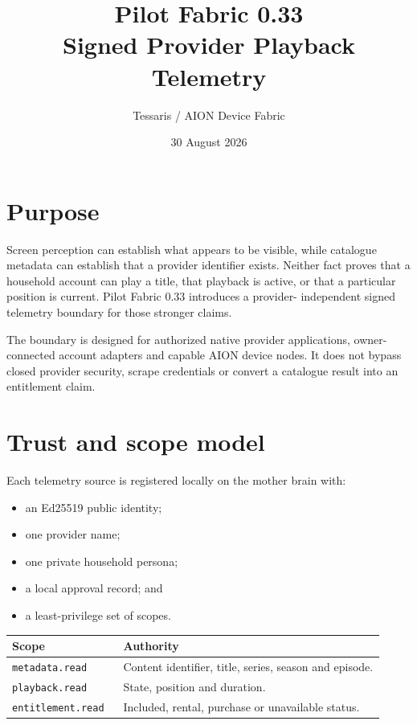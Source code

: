 \documentclass[11pt,a4paper]{article}
\title{Pilot Fabric 0.33\\Signed Provider Playback Telemetry}
\author{Tessaris / AION Device Fabric}
\date{30 August 2026}
\begin{document}
\maketitle

\section{Purpose}

Screen perception can establish what appears to be visible, while catalogue
metadata can establish that a provider identifier exists. Neither fact proves
that a household account can play a title, that playback is active, or that a
particular position is current. Pilot Fabric 0.33 introduces a provider-
independent signed telemetry boundary for those stronger claims.

The boundary is designed for authorized native provider applications, owner-
connected account adapters and capable AION device nodes. It does not bypass
closed provider security, scrape credentials or convert a catalogue result into
an entitlement claim.

\section{Trust and scope model}

Each telemetry source is registered locally on the mother brain with:

\begin{itemize}
  \item an Ed25519 public identity;
  \item one provider name;
  \item one private household persona;
  \item a local approval record; and
  \item a least-privilege set of scopes.
\end{itemize}

\begin{longtable}{p{0.27\linewidth}p{0.65\linewidth}}
\toprule
\textbf{Scope} & \textbf{Authority} \\
\midrule
\endhead
\texttt{metadata.read} & Content identifier, title, series, season and episode. \\
\texttt{playback.read} & State, position and duration. \\
\texttt{entitlement.read} & Included, rental, purchase or unavailable status. \\
\bottomrule
\end{longtable}
\end{document}
